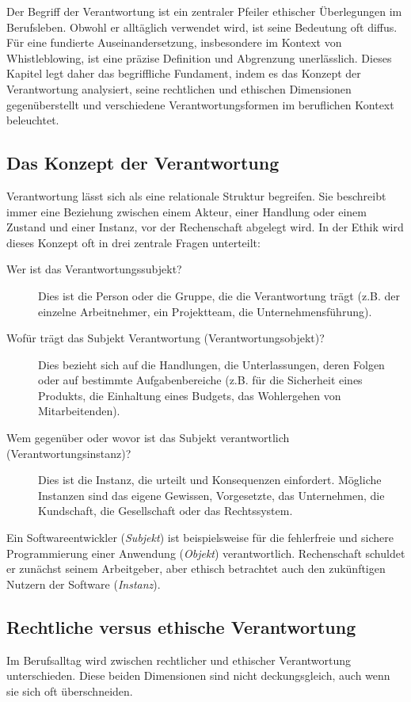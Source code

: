 \documentclass[
    12pt,               %
    a4paper,            %
    ngerman             %
]{scrartcl}
\begin{document}
Der Begriff der Verantwortung ist ein zentraler Pfeiler ethischer Überlegungen im Berufsleben. Obwohl er alltäglich verwendet wird, ist seine Bedeutung oft diffus. Für eine fundierte Auseinandersetzung, insbesondere im Kontext von Whistleblowing, ist eine präzise Definition und Abgrenzung unerlässlich. Dieses Kapitel legt daher das begriffliche Fundament, indem es das Konzept der Verantwortung analysiert, seine rechtlichen und ethischen Dimensionen gegenüberstellt und verschiedene Verantwortungsformen im beruflichen Kontext beleuchtet.

\subsection{Das Konzept der Verantwortung}
Verantwortung lässt sich als eine relationale Struktur begreifen. Sie beschreibt immer eine Beziehung zwischen einem Akteur, einer Handlung oder einem Zustand und einer Instanz, vor der Rechenschaft abgelegt wird. In der Ethik wird dieses Konzept oft in drei zentrale Fragen unterteilt:

\begin{description}
    \item[Wer ist das Verantwortungssubjekt?] Dies ist die Person oder die Gruppe, die die Verantwortung trägt (z.B. der einzelne Arbeitnehmer, ein Projektteam, die Unternehmensführung).
    \item[Wofür trägt das Subjekt Verantwortung (Verantwortungsobjekt)?] Dies bezieht sich auf die Handlungen, die Unterlassungen, deren Folgen oder auf bestimmte Aufgabenbereiche (z.B. für die Sicherheit eines Produkts, die Einhaltung eines Budgets, das Wohlergehen von Mitarbeitenden).
    \item[Wem gegenüber oder wovor ist das Subjekt verantwortlich (Verantwortungsinstanz)?] Dies ist die Instanz, die urteilt und Konsequenzen einfordert. Mögliche Instanzen sind das eigene Gewissen, Vorgesetzte, das Unternehmen, die Kundschaft, die Gesellschaft oder das Rechtssystem.
\end{description}

Ein Softwareentwickler (\textit{Subjekt}) ist beispielsweise für die fehlerfreie und sichere Programmierung einer Anwendung (\textit{Objekt}) verantwortlich. Rechenschaft schuldet er zunächst seinem Arbeitgeber, aber ethisch betrachtet auch den zukünftigen Nutzern der Software (\textit{Instanz}).

\subsection{Rechtliche versus ethische Verantwortung} %
Im Berufsalltag wird zwischen rechtlicher und ethischer Verantwortung unterschieden. Diese beiden Dimensionen sind nicht deckungsgleich, auch wenn sie sich oft überschneiden.
\end{document}
